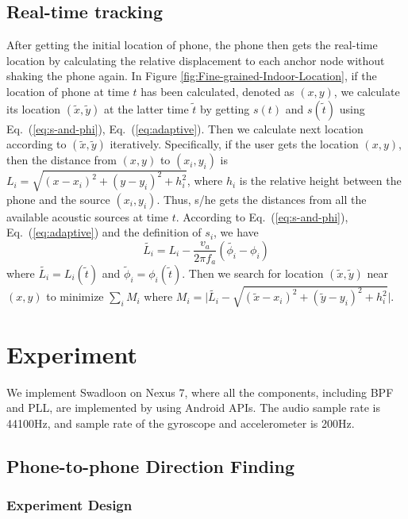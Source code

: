 \documentclass[]{sig-alternate-10pt}
\newcommand{\eqqref}[1]{Eq.~(\ref{#1})}
\def \ourprotocol{Swadloon\xspace}
\begin{document}
\subsection{Real-time tracking}
\label{sec:realtimetracking}
After getting the initial location of phone, the phone then gets the
 real-time location  by  calculating the
 relative displacement to each anchor node without shaking the phone
 again.
In Figure \ref{fig:Fine-grained-Indoor-Location}, if the location of
 phone at time $t$ has been calculated,
 denoted as $(x,y)$, we calculate its location $(\tilde{x},\tilde{y})$
 at the latter time $\tilde{t}$ by getting $s(t)$ and $s(\tilde{t})$
 using \eqqref{eq:s-and-phi}, \eqqref{eq:adaptive}. 
Then we calculate next location according to
 $(\tilde{x},\tilde{y})$ iteratively.
Specifically,
 if the user gets the location $(x,y)$, then the distance from $(x,y)$
 to $(x_i,y_i)$ is
 $    L_{i}=\sqrt{(x-x_{i})^{2}+(y-y_{i})^{2}+h_i^2}$,
where $h_i$ is the relative height between the phone and the source
$(x_i,y_i)$. Thus, s/he gets the distances from all the available
acoustic sources at time $t$.
According to \eqqref{eq:s-and-phi}, \eqqref{eq:adaptive} and the definition of $s_i$, we have
\begin{equation}
        \tilde{L_i}=L_i-\frac{v_{a}}{2\pi f_{a}} (\tilde{\phi_i}-\phi_i)
\label{distance_in_specific_moment}
\end{equation}
where $\tilde{L_i}=L_i(\tilde t)$ and $\tilde \phi_i = \phi_i(\tilde t)$. 
Then we search for location
$(\tilde{x},\tilde{y})$ near $(x,y)$ to minimize $\sum _i M_i$ where
$    M_i=\big | \tilde{L_i}-\sqrt{(\tilde{x}-x_i)^2+(\tilde{y}-y_i)^2+h_i^2} \big|$.


\section{Experiment}
\label{sec:experiment}

We implement \ourprotocol on Nexus 7, where all the components, including BPF and PLL, are implemented by using Android APIs.
The audio sample rate is  44100Hz, and sample rate of the gyroscope and
 accelerometer is 200Hz.


\subsection{Phone-to-phone Direction Finding}
\label{sec:p2pexp}
\subsubsection{Experiment Design}
\end{document}
